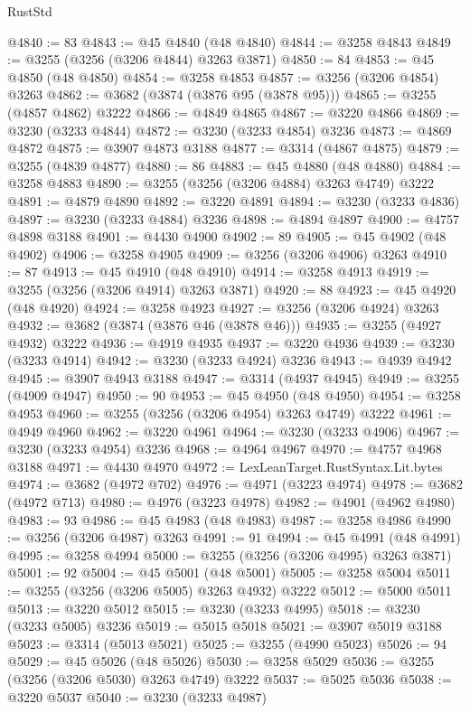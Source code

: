 \begin{lexlean}{RustStd}
\begin{coremodule}
@4840 := 83
@4843 := @45 @4840 (@48 @4840)
@4844 := @3258 @4843
@4849 := @3255 (@3256 (@3206 @4844) @3263 @3871)
@4850 := 84
@4853 := @45 @4850 (@48 @4850)
@4854 := @3258 @4853
@4857 := @3256 (@3206 @4854) @3263
@4862 := @3682 (@3874 (@3876 @95 (@3878 @95)))
@4865 := @3255 (@4857 @4862) @3222
@4866 := @4849 @4865
@4867 := @3220 @4866
@4869 := @3230 (@3233 @4844)
@4872 := @3230 (@3233 @4854) @3236
@4873 := @4869 @4872
@4875 := @3907 @4873 @3188
@4877 := @3314 (@4867 @4875)
@4879 := @3255 (@4839 @4877)
@4880 := 86
@4883 := @45 @4880 (@48 @4880)
@4884 := @3258 @4883
@4890 := @3255 (@3256 (@3206 @4884) @3263 @4749) @3222
@4891 := @4879 @4890
@4892 := @3220 @4891
@4894 := @3230 (@3233 @4836)
@4897 := @3230 (@3233 @4884) @3236
@4898 := @4894 @4897
@4900 := @4757 @4898 @3188
@4901 := @4430 @4900
@4902 := 89
@4905 := @45 @4902 (@48 @4902)
@4906 := @3258 @4905
@4909 := @3256 (@3206 @4906) @3263
@4910 := 87
@4913 := @45 @4910 (@48 @4910)
@4914 := @3258 @4913
@4919 := @3255 (@3256 (@3206 @4914) @3263 @3871)
@4920 := 88
@4923 := @45 @4920 (@48 @4920)
@4924 := @3258 @4923
@4927 := @3256 (@3206 @4924) @3263
@4932 := @3682 (@3874 (@3876 @46 (@3878 @46)))
@4935 := @3255 (@4927 @4932) @3222
@4936 := @4919 @4935
@4937 := @3220 @4936
@4939 := @3230 (@3233 @4914)
@4942 := @3230 (@3233 @4924) @3236
@4943 := @4939 @4942
@4945 := @3907 @4943 @3188
@4947 := @3314 (@4937 @4945)
@4949 := @3255 (@4909 @4947)
@4950 := 90
@4953 := @45 @4950 (@48 @4950)
@4954 := @3258 @4953
@4960 := @3255 (@3256 (@3206 @4954) @3263 @4749) @3222
@4961 := @4949 @4960
@4962 := @3220 @4961
@4964 := @3230 (@3233 @4906)
@4967 := @3230 (@3233 @4954) @3236
@4968 := @4964 @4967
@4970 := @4757 @4968 @3188
@4971 := @4430 @4970
@4972 := LexLeanTarget.RustSyntax.Lit.bytes
@4974 := @3682 (@4972 @702)
@4976 := @4971 (@3223 @4974)
@4978 := @3682 (@4972 @713)
@4980 := @4976 (@3223 @4978)
@4982 := @4901 (@4962 @4980)
@4983 := 93
@4986 := @45 @4983 (@48 @4983)
@4987 := @3258 @4986
@4990 := @3256 (@3206 @4987) @3263
@4991 := 91
@4994 := @45 @4991 (@48 @4991)
@4995 := @3258 @4994
@5000 := @3255 (@3256 (@3206 @4995) @3263 @3871)
@5001 := 92
@5004 := @45 @5001 (@48 @5001)
@5005 := @3258 @5004
@5011 := @3255 (@3256 (@3206 @5005) @3263 @4932) @3222
@5012 := @5000 @5011
@5013 := @3220 @5012
@5015 := @3230 (@3233 @4995)
@5018 := @3230 (@3233 @5005) @3236
@5019 := @5015 @5018
@5021 := @3907 @5019 @3188
@5023 := @3314 (@5013 @5021)
@5025 := @3255 (@4990 @5023)
@5026 := 94
@5029 := @45 @5026 (@48 @5026)
@5030 := @3258 @5029
@5036 := @3255 (@3256 (@3206 @5030) @3263 @4749) @3222
@5037 := @5025 @5036
@5038 := @3220 @5037
@5040 := @3230 (@3233 @4987)

\end{coremodule}
\end{lexlean}
